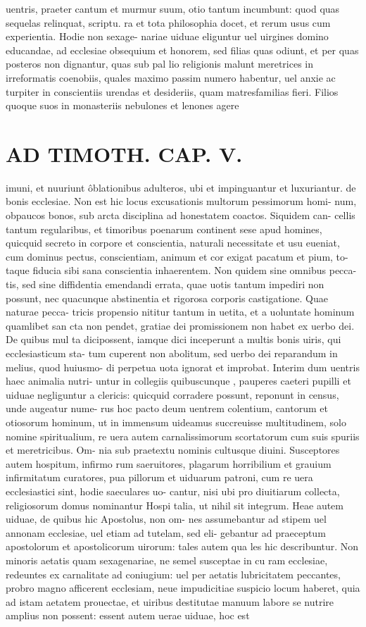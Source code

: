 \documentclass{article}
\begin{document}
\begin{pages}
uentris, praeter cantum et murmur suum, otio tantum incumbunt: quod quas sequelas relinquat, scriptu. ra et tota philosophia docet, et rerum usus cum experientia. Hodie non sexage- nariae uiduae eliguntur uel uirgines domino educandae, ad ecclesiae obsequium et honorem, sed filias quas odiunt, et per quas posteros non dignantur, quas sub pal lio religionis malunt meretrices in irreformatis coenobiis, quales maximo passim numero habentur, uel anxie ac turpiter in conscientiis urendas et desideriis, quam matresfamilias fieri. Filios quoque suos in monasteriis nebulones et lenones agere  \pend
\section*{AD TIMOTH. CAP. V. }
\marginpar{[ p.517 ]}\pstart imuni, et nuuriunt ôblationibus adulteros, ubi et impinguantur et luxuriantur. de bonis ecclesiae. Non est hic locus excusationis multorum pessimorum homi- num, obpaucos bonos, sub arcta disciplina ad honestatem coactos. Siquidem can- cellis tantum regularibus, et timoribus poenarum continent sese apud homines, quicquid secreto in corpore et conscientia, naturali necessitate et usu eueniat, cum dominus pectus, conscientiam, animum et cor exigat pacatum et pium, to- taque fiducia sibi sana conscientia inhaerentem. Non quidem sine omnibus pecca- tis, sed sine diffidentia emendandi errata, quae uotis tantum impediri non possunt, nec quacunque abstinentia et rigorosa corporis castigatione. Quae naturae pecca- tricis propensio nititur tantum in uetita, et a uoluntate hominum quamlibet san cta non pendet, gratiae dei promissionem non habet ex uerbo dei. De quibus mul ta dicipossent, iamque dici inceperunt a multis bonis uiris, qui ecclesiasticum sta- tum cuperent non abolitum, sed uerbo dei reparandum in melius, quod huiusmo- di perpetua uota ignorat et improbat. Interim dum uentris haec animalia nutri- untur in collegiis quibuscunque , pauperes caeteri pupilli et uiduae negliguntur a clericis: quicquid corradere possunt, reponunt in census, unde augeatur nume- rus hoc pacto deum uentrem colentium, cantorum et otiosorum hominum, ut in immensum uideamus succreuisse multitudinem, solo nomine spiritualium, re uera autem carnalissimorum scortatorum cum suis spuriis et meretricibus. Om- nia sub praetextu nominis cultusque diuini. Susceptores autem hospitum, infirmo rum saeruitores, plagarum horribilium et grauium infirmitatum curatores, pua pillorum et uiduarum patroni, cum re uera ecclesiastici sint, hodie saeculares uo- cantur, nisi ubi pro diuitiarum collecta, religiosorum domus nominantur Hospi talia, ut nihil sit integrum. Heae autem uiduae, de quibus hic Apostolus, non om- nes assumebantur ad stipem uel annonam ecclesiae, uel etiam ad tutelam, sed eli- gebantur ad praeceptum apostolorum et apostolicorum uirorum: tales autem qua les hic describuntur. Non minoris aetatis quam sexagenariae, ne semel susceptae in cu ram ecclesiae, redeuntes ex carnalitate ad coniugium: uel per aetatis lubricitatem peccantes, probro magno afficerent ecclesiam, neue impudicitiae suspicio locum haberet, quia ad istam aetatem prouectae, et uiribus destitutae manuum labore se nutrire amplius non possent: essent autem uerae uiduae, hoc est 
\end{pages}
\end{document}
